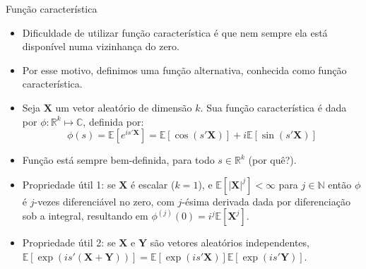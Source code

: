 \documentclass[11pt]{beamer}
\begin{document}
	\begin{frame}{Função característica}
		\begin{itemize}
			\item Dificuldade de utilizar função característica é que nem sempre ela está disponível numa vizinhança do zero.
			\item Por esse motivo, definimos uma função alternativa, conhecida como {\color{red}função característica}. 
			\item Seja $\boldsymbol{X}$ um vetor aleatório de dimensão $k$. Sua função característica é dada por $\phi: \mathbb{R}^k \mapsto \mathbb{C}$, definida por:
			\begin{equation*}
				\phi(s) = \mathbb{E}[e^{is'\boldsymbol{X}}] = \mathbb{E}[\cos(s'\boldsymbol{X})] + i \mathbb{E}[\sin(s'\boldsymbol{X})]
			\end{equation*} 
			\item Função está sempre bem-definida, para todo $s \in \mathbb{R}^k$ (por quê?).
			\item {\color{blue}Propriedade útil 1:} se $\boldsymbol{X}$ é escalar ($k=1$), e $\mathbb{E}[|\boldsymbol{X}|^j]<\infty$ para $j \in \mathbb{N}$ então $\phi$ é $j$-vezes diferenciável no zero, com $j$-ésima derivada dada por diferenciação sob a integral, resultando em $\phi^{(j)}(0) = i^j \mathbb{E}[\boldsymbol{X}^j]$.
			\item {\color{blue}Propriedade útil 2:} se $\boldsymbol{X}$ e $\boldsymbol{Y}$ são vetores aleatórios independentes, $\mathbb{E}[\exp(is'(\boldsymbol{X}+\boldsymbol{Y}))] = \mathbb{E}[\exp(is'\boldsymbol{X})] \mathbb{E}[\exp(is'\boldsymbol{Y})]$. 
		\end{itemize}
	\end{frame}
	
\end{document}
